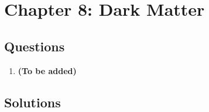 \clearpage
\section{Chapter 8: Dark Matter}

\subsection{Questions}

\begin{enumerate}[label=8.\arabic*]
  \item \label{q:8.1} \textbf{(To be added)}
\end{enumerate}

\bigskip
\bigskip
\bigskip

\subsection{Solutions}


